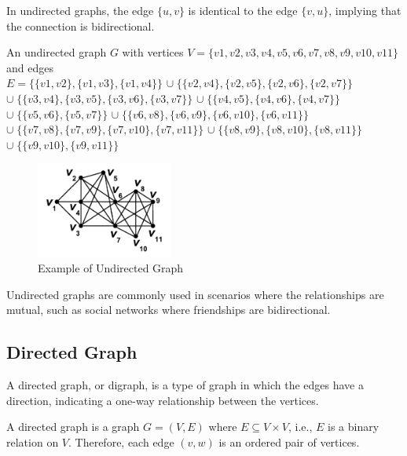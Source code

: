 In undirected graphs, the edge $\{u, v\}$ is identical to the edge $\{v, u\}$, implying that the connection is bidirectional.

\begin{myex}
    An undirected graph $G$ with vertices $V = \{v1, v2, v3, v4, v5, v6, v7, v8, v9, v10, v11\}$ and edges \\
    $E= \{\{v1, v2\}, \{v1, v3\}, \{v1, v4\}\}$
    $\cup \; \{\{v2, v4\}, \{v2, v5\}, \{v2, v6\}, \{v2, v7\}\}$ \\
    $\cup \; \{\{v3, v4\}, \{v3, v5\}, \{v3, v6\}, \{v3, v7\}\}$
    $\cup \; \{\{v4, v5\}, \{v4, v6\}, \{v4, v7\}\}$
    $\cup \; \{\{v5, v6\}, \{v5, v7\}\}$
    $\cup \; \{\{v6, v8\}, \{v6, v9\}, \{v6, v10\}, \{v6, v11\}\}$
    $\cup \; \{\{v7, v8\}, \{v7, v9\}, \{v7, v10\}, \{v7, v11\}\}$
    $\cup \; \{\{v8, v9\}, \{v8, v10\}, \{v8, v11\}\}$
    $\cup \; \{\{v9, v10\}, \{v9, v11\}\}$

    \begin{figure}[!h]
        \centering
        \includegraphics[width=0.40\textwidth]{images/graphs/undirected_graph_wikipedia}
        \caption{Example of Undirected Graph}
        \label{fig:example-undirected-graph}
    \end{figure}
\end{myex}

Undirected graphs are commonly used in scenarios where the relationships are mutual, such as social networks where friendships are bidirectional.

\subsection*{Directed Graph}\label{subsec:directed-graph}

A directed graph, or digraph, is a type of graph in which the edges have a direction, indicating a one-way relationship between the vertices.

A directed graph is a graph $G = (V, E)$ where $E \subseteq V \times V$, i.e., $E$ is a binary relation on $V$.
Therefore, each edge $(v, w)$ is an ordered pair of vertices.

